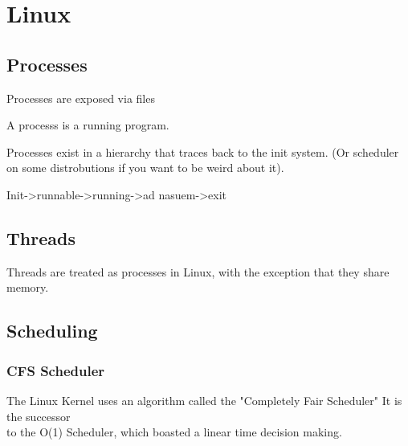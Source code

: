 \documentclass[letterpaper,10pt,notitlepage,fleqn]{article}
\begin{document}
\section{Linux}



\subsection{Processes}

Processes are exposed via files

A processs is a running program. 

Processes exist in a hierarchy that traces back to the init system. (Or scheduler
on some distrobutions if you want to be weird about it). 

Init->runnable->running->ad nasuem->exit

\subsection{Threads}

Threads are treated as processes in Linux, with the exception that they share memory. 


\subsection{Scheduling}



\subsubsection{CFS Scheduler}

The Linux Kernel uses an algorithm called the "Completely Fair Scheduler" It is the successor\\
to the O(1) Scheduler, which boasted a linear time decision making. 


\end{document}
